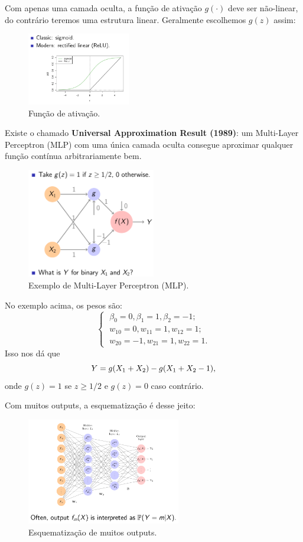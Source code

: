 \documentclass[a4paper,fleqn,12pt]{article}
\begin{document}
Com apenas uma camada oculta, a função de ativação $g(\cdot)$ deve ser não-linear, do contrário teremos uma estrutura linear. Geralmente escolhemos $g(z)$ assim:
\begin{figure}[H]
\centering
\includegraphics[width=0.4\textwidth]{fig/activation_function.png}
\caption{Função de ativação.}
\label{fig:units_activation_functions}
\end{figure}

Existe o chamado \textbf{Universal Approximation Result (1989)}: um Multi-Layer Perceptron (MLP) com uma única camada oculta consegue aproximar qualquer função contínua arbitrariamente bem.
\begin{figure}[H]
\centering
\includegraphics[width=0.5\textwidth]{fig/example_mlp.png}
\caption{Exemplo de Multi-Layer Perceptron (MLP).}
\label{fig:example_mlp}
\end{figure}

No exemplo acima, os pesos são:
$$
\begin{cases}
\; \beta_0 = 0, \beta_1 = 1, \beta_2 = -1; \\
\; w_{10} = 0 , w_{11} = 1, w_{12} = 1; \\
\; w_{20} = -1, w_{21} = 1, w_{22} = 1.
\end{cases}
$$
Isso nos dá que
$$
Y = g\qty(X_1 + X_2) - g\qty(X_1 + X_2 - 1),
$$
onde $g(z) = 1$ se $z \geq 1/2$ e $g(z) = 0$ caso contrário.

Com muitos outputs, a esquematização é desse jeito:
\begin{figure}[H]
\centering
\includegraphics[width=0.6\textwidth]{fig/many_outputs.png}
\caption{Esquematização de muitos outputs.}
\label{fig:many_outputs}
\end{figure}
\end{document}
